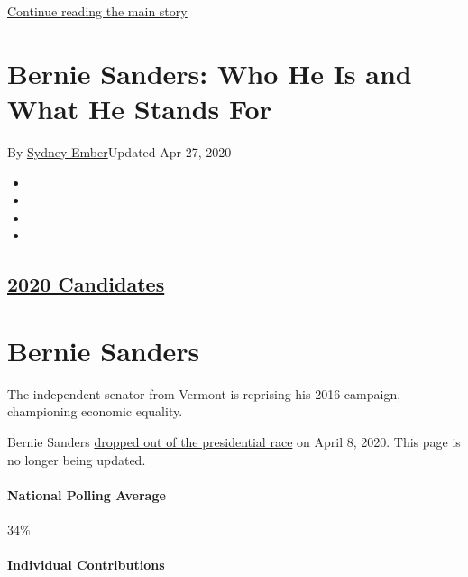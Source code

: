 \protect\hyperlink{after-top}{Continue reading the main story}

\hypertarget{bernie-sanders-who-he-is-and-what-he-stands-for}{%
\section{Bernie Sanders: Who He Is and What He Stands
For}\label{bernie-sanders-who-he-is-and-what-he-stands-for}}

By \href{https://www.nytimes3xbfgragh.onion/by/sydney-ember}{Sydney
Ember}Updated Apr 27, 2020

\begin{itemize}
\item
\item
\item
\item
\end{itemize}

\hypertarget{2020-candidates-}{%
\subsection{\texorpdfstring{\href{https://www.nytimes3xbfgragh.onion/interactive/2019/us/politics/2020-presidential-candidates.html}{2020
Candidates} }{2020 Candidates }}\label{2020-candidates-}}

\hypertarget{bernie-sanders}{%
\section{Bernie Sanders}\label{bernie-sanders}}

The independent senator from Vermont is reprising his 2016 campaign,
championing economic equality.

Bernie Sanders
\href{https://www.nytimes3xbfgragh.onion/2020/04/08/us/politics/bernie-sanders-drops-out.html}{dropped
out of the presidential race} on April 8, 2020. This page is no longer
being updated.

\hypertarget{national-polling-average}{%
\paragraph{National Polling Average}\label{national-polling-average}}

34\%

\hypertarget{individual-contributions}{%
\paragraph{Individual Contributions}\label{individual-contributions}}


